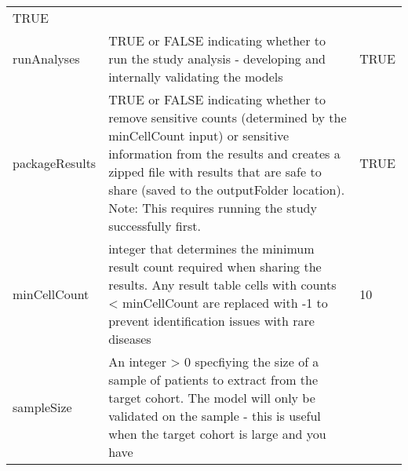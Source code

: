 \documentclass[
]{article}
\begin{document}
\begin{longtable}[]{@{}lll@{}}
\begin{minipage}[t]{0.24\columnwidth}
TRUE\strut
\end{minipage}\tabularnewline
\begin{minipage}[t]{0.21\columnwidth}\raggedright
runAnalyses\strut
\end{minipage} & \begin{minipage}[t]{0.46\columnwidth}\raggedright
TRUE or FALSE indicating whether to run the study analysis - developing
and internally validating the models\strut
\end{minipage} & \begin{minipage}[t]{0.24\columnwidth}\raggedright
TRUE\strut
\end{minipage}\tabularnewline
\begin{minipage}[t]{0.21\columnwidth}\raggedright
packageResults\strut
\end{minipage} & \begin{minipage}[t]{0.46\columnwidth}\raggedright
TRUE or FALSE indicating whether to remove sensitive counts (determined
by the minCellCount input) or sensitive information from the results and
creates a zipped file with results that are safe to share (saved to the
outputFolder location). Note: This requires running the study
successfully first.\strut
\end{minipage} & \begin{minipage}[t]{0.24\columnwidth}\raggedright
TRUE\strut
\end{minipage}\tabularnewline
\begin{minipage}[t]{0.21\columnwidth}\raggedright
minCellCount\strut
\end{minipage} & \begin{minipage}[t]{0.46\columnwidth}\raggedright
integer that determines the minimum result count required when sharing
the results. Any result table cells with counts \textless{} minCellCount
are replaced with -1 to prevent identification issues with rare
diseases\strut
\end{minipage} & \begin{minipage}[t]{0.24\columnwidth}\raggedright
10\strut
\end{minipage}\tabularnewline
\begin{minipage}[t]{0.21\columnwidth}\raggedright
sampleSize\strut
\end{minipage} & \begin{minipage}[t]{0.46\columnwidth}\raggedright
An integer \textgreater{} 0 specfiying the size of a sample of patients
to extract from the target cohort. The model will only be validated on
the sample - this is useful when the target cohort is large and you have

\end{minipage}
\end{longtable}
\end{document}
